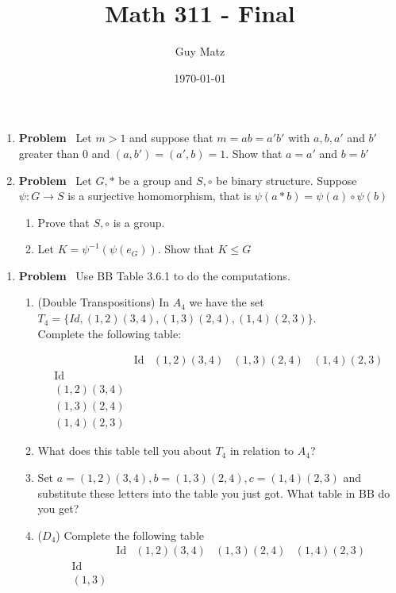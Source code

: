 \documentclass[12pt]{amsart}
\title{\textbf{Math 311 - Final}}
\author{Guy Matz}
\date{\today}
\newcommand{\benu}{\begin{enumerate}}
\newcommand{\eenu}{\end{enumerate}}
\theoremstyle{definition}
\DeclareMathOperator{\Id}{Id}
\newcommand{\itep}{\item {\bfseries Problem}\ }
\begin{document}
 


\begin{enumerate}[series=p]
\itep 
\label{drp}Let $m>1$ and suppose that $m=ab=a'b'$ with $a,b,a'$ and $b'$ greater than $0$ and $(a,b')=(a',b)=1$. Show that  $a=a'$ and $b=b'$

\newpage

\itep
Let $G,\ast$ be a group and $S,\circ$ be binary structure. Suppose $\psi\colon G\to S$ is a surjective homomorphism, that is $\psi(a\ast b)=\psi(a)\circ\psi(b)$
\benu
\item Prove that $S,\circ$ is a group.
\item Let $K=\psi^{-1}(\psi(e_G))$. Show that $K\leq G$
\eenu
\end{enumerate}

\newpage

\begin{enumerate}[resume=p]
\itep \label{D4comp} Use BB Table 3.6.1 to do the computations.
\benu
\item (Double Transpositions) \label{dt} In $A_4$ we have the set\\ $T_4=\{Id,(1,2)(3,4),(1,3)(2,4),(1,4)(2,3)\}$.\\
Complete the following table:

\begin{equation*}
\begin{array}{c|c|c|c|c}
	& \Id	&(1,2)(3,4)&(1,3)(2,4)&(1,4)(2,3)\\
\hline
\Id	&	&	&	&\\
\hline
(1,2)(3,4)	&	&	&	&\\
\hline
(1,3)(2,4)&	&	&	&\\
\hline	
(1,4)(2,3)&	&	&	&
\end{array}				
\end{equation*}
\item What does this table tell you about $T_4$ in relation to $A_4$?
\item Set $a=(1,2)(3,4),b=(1,3)(2,4),c=(1,4)(2,3)$ and substitute these letters into the table you just got. What table in BB do you get?
\item ($D_4$) Complete the following table
\begin{equation*} 
\begin{array}{c|c|c|c|c}
	&\Id	&(1,2)(3,4)	&(1,3)(2,4)	&(1,4)(2,3)	 \\
\hline	
	\Id&	&	&	&	\\
\hline	
	(1,3)&	&	&	&
\end{array}
\end{equation*}

\eenu
\end{enumerate}
\end{document}
